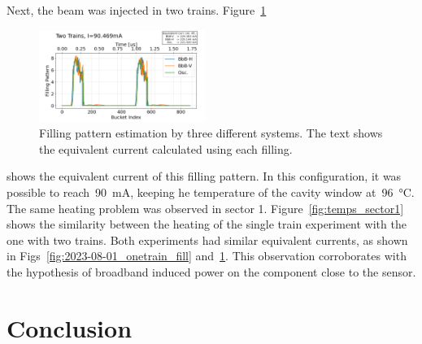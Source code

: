 \documentclass
[
    a4paper,
    biblatex,     %
]{jacow}
\begin{document}
    Next, the beam was injected in two trains. Figure~\ref{fig:2023-08-01_twotrains_fill}
    \begin{figure}
        \centering
        \includegraphics[width=0.48\textwidth]{trains2_run1_curr90p469.png}
        \caption{Filling pattern estimation by three different systems. The text shows the equivalent current calculated using each filling.}
        \label{fig:2023-08-01_twotrains_fill}
    \end{figure}
    shows the equivalent current of this filling pattern. In this configuration, it was possible to reach~\SI{90}{\milli\ampere}, keeping he temperature of the cavity window at~\SI{96}{\celsius}. The same heating problem was observed in sector 1. Figure~\ref{fig:temps_sector1} shows the similarity between the heating of the single train experiment with the one with two trains. Both experiments had similar equivalent currents, as shown in Figs~\ref{fig:2023-08-01_onetrain_fill} and~\ref{fig:2023-08-01_twotrains_fill}. This observation corroborates with the hypothesis of broadband induced power on the component close to the sensor.

\section{Conclusion}
\end{document}
